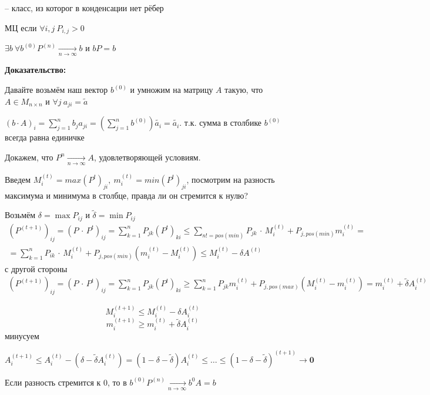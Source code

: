  -- класс, из которог в конденсации нет рёбер



МЦ  если $\forall i, j \ P_{i,j} > 0$




    $\exists b \ \forall b^{(0)}P^{(n)} \xrightarrow[n\rightarrow\infty]{}b $ и $bP = b$
    
    \textbf{Доказательство:}
    
    Давайте возьмём наш вектор $b^{(0)}$ и умножим на матрицу $A$ такую, 
    что $A \in M_{n \times n}$ и $\forall j \ a_{ji} = \tilde{a}$ 
    
    $(b \cdot A)_i = \sum_{j = 1}^n b_j a_{ji} = (\sum_{j = 1}^n b^{(0)})\tilde{a_i} = \tilde{a_i}$.
    т.к. сумма в столбике $b^{(0)}$ всегда равна единичке

    Докажем, что $P^n\xrightarrow[n\rightarrow\infty]{} A$, удовлетворяющей условиям.
    
    Введем $M_i^{(t)} = max(P^t)_{ji}, \ m_i^{(t)} = min(P^t)_{ji}$, посмотрим на разность максимума и минимума в столбце, правда ли он стремится к нулю?

    Возьмём $\delta = \max P_{ij}$ и $\tilde{\delta} = \min P_{ij}$  
    \begin{multline*}
    (P^{(t+1)})_{ij} = (P \,\cdot\,P^t)_{ij} = \sum_{k = 1}^n P_{jk}(P^t)_{ki} \le \sum_{n != pos(min)}P_{jk}\,\cdot\,M_i^{(t)} + P_{j, pos(min)}m_i^{(t)} =\\ = \sum_{k=1}^nP_{ik}\,\cdot\,M_i^{(t)} + P_{j, pos(min)}(m_i^{(t)} - M_i^{(t)}) \le M_i^{(t)} -\delta A^{(t)}
    \end{multline*}
    с другой стороны
    \begin{multline*}
    (P^{(t+1)})_{ij} = (P \,\cdot\,P^t)_{ij} = \sum_{k = 1}^n P_{jk}(P^t)_{ki} \ge \sum_{k = 1}^n P_{jk}m_i^{(t)} +P_{j, pos(max)}(M_i^{(t)} - m_i^{(t)})= m_i^{(t)} + \tilde{\delta} A_i^{(t)}
    \end{multline*}

    $$M_i^{(t+1)} \le M_i^{(t)} - \delta A_i^{(t)}$$
    $$m_i^{(t+1)} \ge m_i^{(t)} + \tilde{\delta}A_i^{(t)}$$
    минусуем

    $$A_i^{(t+1)} \le A_i^{(t)} - (\delta - \tilde{\delta} A_i^{(t)})  = (1 - \delta - \tilde{\delta})A_i^{(t)} \le \ldots \le (1 - \delta - \tilde{\delta})^{(t+1)} \rightarrow \mathbf{0}$$

    Если разность стремится к 0, то в 
    $b^{(0)}P^{(n)} \xrightarrow[n\rightarrow\infty]{} b^0A = b$

